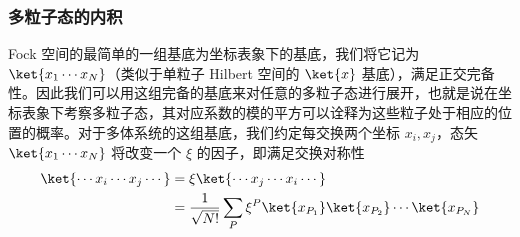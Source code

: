\subsubsection{多粒子态的内积}
Fock 空间的最简单的一组基底为坐标表象下的基底，我们将它记为 $\ket{x_1\cdots x_N}$（类似于单粒子 Hilbert 空间的 $\ket{x}$ 基底），满足正交完备性。因此我们可以用这组完备的基底来对任意的多粒子态进行展开，也就是说在坐标表象下考察多粒子态，其对应系数的模的平方可以诠释为这些粒子处于相应的位置的概率。对于多体系统的这组基底，我们约定每交换两个坐标 $x_i,x_j$，态矢 $\ket{x_1\cdots x_N}$ 将改变一个 $\xi$ 的因子，即满足交换对称性
\begin{equation}
\begin{aligned}
\ket{\cdots x_i \cdots x_j \cdots}& =
\xi \ket{\cdots x_j \cdots x_i \cdots} \\
&=\frac{1}{\sqrt{N!}}\sum_P \xi^P\ket{x_{P_1}}\ket{x_{P_2}}\cdots\ket{x_{P_N}}
\end{aligned}
\end{equation}

